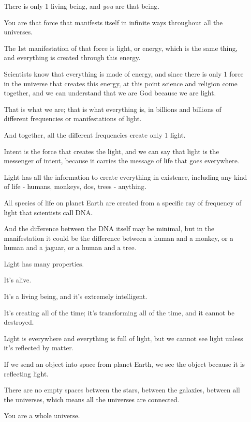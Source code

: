 \documentclass{article}
\numberwithin{equation}{section}
\begin{document}
There is only 1 living being, and \textit{you} are that being.

You are that force that manifests itself in infinite ways throughout all the universes.

The 1st manifestation of that force is light, or energy, which is the same thing, and everything is created through this energy.

Scientists know that everything is made of energy, and since there is only 1 force in the universe that creates this energy, at this point science and religion come together, and we can understand that we are God because we are light.

That is what we are; that is what everything is, in billions and billions of different frequencies or manifestations of light.

And together, all the different frequencies create only 1 light.

%
Intent is the force that creates the light, and we can say that light is the messenger of intent, because it carries the message of life that goes everywhere.

Light has all the information to create everything in existence, including any kind of life - humans, monkeys, dos, trees - anything.

All species of life on planet Earth are created from a specific ray of frequency of light that scientists call DNA.

And the difference between the DNA itself may be minimal, but in the manifestation it could be the difference between a human and a monkey, or a human and a jaguar, or a human and a tree.

%
Light has many properties.

It's alive.

It's a living being, and it's extremely intelligent.

It's creating all of the time; it's transforming all of the time, and it cannot be destroyed.

Light is everywhere and everything is full of light, but we cannot see light unless it's reflected by matter.

If we send an object into space from planet Earth, we see the object because it is reflecting light.

There are no empty spaces between the stars, between the galaxies, between all the universes, which means all the universes are connected.

%
You are a whole universe.
\end{document}

